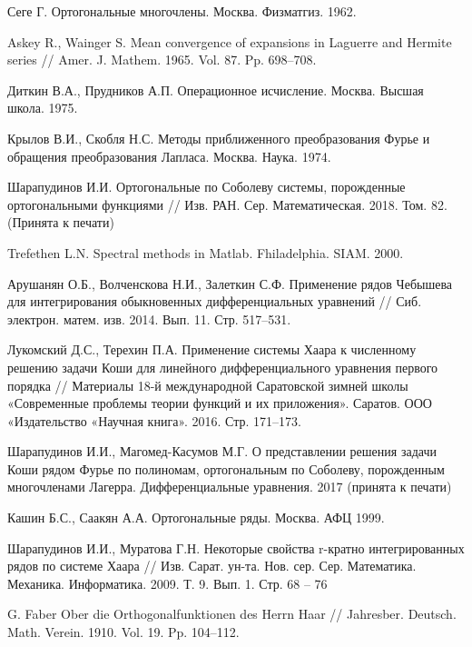 \begin{thebibliography}{111}
{Сеге Г.}
Ортогональные многочлены. Москва. Физматгиз. 1962.


{Askey R., Wainger S.}
Mean convergence of expansions in Laguerre and Hermite series // Amer. J. Mathem. 1965. Vol. 87. Pp. 698--708.


{Диткин В.А., Прудников А.П.}
Операционное исчисление. Москва. Высшая школа. 1975.


{Крылов В.И., Скобля Н.С.}
Методы приближенного преобразования Фурье и обращения преобразования Лапласа. Москва. Наука. 1974.


Шарапудинов И.И. Ортогональные  по Соболеву системы, порожденные ортогональными функциями // Изв. РАН. Сер. Математическая. 2018. Том. 82. (Принята к печати)


{Trefethen  L.N.}
Spectral methods in Matlab. Fhiladelphia. SIAM. 2000.


{Арушанян О.Б., Волченскова Н.И., Залеткин С.Ф.}
Применение рядов Чебышева для интегрирования обыкновенных дифференциальных уравнений // Сиб. электрон. матем. изв. 2014. Вып. 11. Стр. 517--531.


{Лукомский Д.С., Терехин П.А.}
Применение системы Хаара к численному решению задачи Коши для линейного дифференциального уравнения первого порядка // Материалы 18-й международной Саратовской зимней школы «Современные проблемы теории функций и их приложения». Саратов. ООО «Издательство «Научная книга». 2016. Стр. 171--173.


{Шарапудинов И.И., Магомед-Касумов М.Г.}
О представлении решения задачи Коши  рядом Фурье  по полиномам, ортогональным по  Соболеву, порожденным многочленами Лагерра. Дифференциальные уравнения. 2017 (принята к печати)


{Кашин Б.С., Саакян А.А.}
Ортогональные ряды. Москва. АФЦ 1999.


{Шарапудинов И.И., Муратова Г.Н.}
Некоторые свойства r-кратно интегрированных рядов по системе Хаара // Изв. Сарат. ун-та. Нов. сер. Сер. Математика. Механика. Информатика. 2009. Т. 9. Вып. 1. Стр. 68 -- 76


{G. Faber}
Ober die Orthogonalfunktionen des Herrn Haar // Jahresber. Deutsch. Math. Verein. 1910. Vol. 19. Pp. 104--112.



\end{thebibliography}
